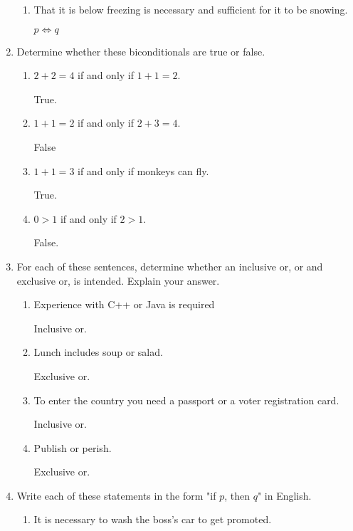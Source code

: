 \documentclass[11pt]{article}
\begin{document}
\begin{enumerate}[label=\textbf{\arabic*.}]
\begin{enumerate}[label=\textbf{\alph*)}]
		\item That it is below freezing is necessary and sufficient for it to be snowing.
		
		$p \iff q$
	\end{enumerate}

	\item Determine whether these biconditionals are true or false.
	\begin{enumerate}[label=\textbf{\alph*)}]
		\item $2 + 2 = 4$ if and only if $1 + 1 = 2$.
		
		True.
		
		\item $1 + 1 = 2$ if and only if $2 + 3 = 4$.
		
		False
		
		\item $1 + 1 = 3$ if and only if monkeys can fly.
		
		True.
		
		\item $0 > 1$ if and only if $2 > 1$.
		
		False.
	\end{enumerate}

	\item For each of these sentences, determine whether an inclusive or, or and exclusive or, is intended. Explain your answer.
	\begin{enumerate}[label=\textbf{\alph*)}]
		\item Experience with C++ or Java is required
		
		Inclusive or.
		
		\item Lunch includes soup or salad.
		
		Exclusive or.
		
		\item To enter the country you need a passport or a voter registration card.
		
		Inclusive or.
		
		\item Publish or perish.
		
		Exclusive or.
	\end{enumerate}

	\item Write each of these statements in the form "if $p$, then $q$" in English.
	\begin{enumerate}[label=\textbf{\alph*)}]
		\item It is necessary to wash the boss's car to get promoted.
		

\end{enumerate}
\end{enumerate}
\end{document}
